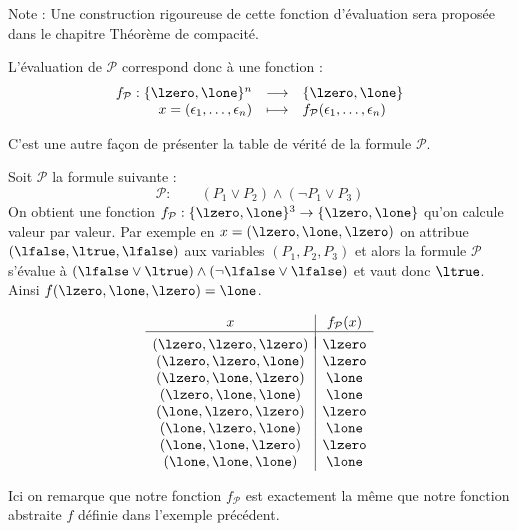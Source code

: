 \documentclass[11pt,class=report,crop=false]{standalone}
\begin{document}
Note : Une construction rigoureuse de cette fonction d'évaluation sera proposée dans le chapitre \og{}Théorème de compacité\fg{}.

L'évaluation de $\mathcal{P}$ correspond donc à une fonction :
\[
\begin{array}{rcl}
	f_{\mathcal{P}} : \{\lzero,\lone\}^n & \longrightarrow & \{\lzero,\lone\} \\
	x= (\epsilon_1,\ldots,\epsilon_n) & \longmapsto & f_{\mathcal{P}}(\epsilon_1,\ldots,\epsilon_n) 
\end{array}
\]

C'est une autre façon de présenter la table de vérité de la formule $\mathcal{P}$.


\begin{exemple}
	Soit $\mathcal{P}$ la formule suivante :
	\[
	\mathcal{P} : \qquad (P_1 \lor P_2) \land (\lnot P_1 \lor P_3)
	\]
	On obtient une fonction $f_{\mathcal{P}} : \{\lzero,\lone\}^3 \to \{\lzero,\lone\}$ qu'on calcule valeur par valeur.
	Par exemple en $x=(\lzero,\lone,\lzero)$ on attribue $(\lfalse,\ltrue,\lfalse)$ aux variables $(P_1,P_2,P_3)$ et alors la formule $\mathcal{P}$ s’évalue à $(\lfalse \lor \ltrue) \land (\lnot \lfalse \lor \lfalse)$ et vaut donc $\ltrue$. Ainsi $f(\lzero,\lone,\lzero) = \lone$.

	\[
	\begin{array}{c|c}
		x & f_{\mathcal{P}}(x) \\
		\hline
		& \\[-2ex]
		(\lzero,\lzero,\lzero) & \lzero \\
		(\lzero,\lzero,\lone)  & \lzero \\
		(\lzero,\lone,\lzero)  & \lone \\
		(\lzero,\lone,\lone)   & \lone \\
		(\lone,\lzero,\lzero)  & \lzero \\
		(\lone,\lzero,\lone)   & \lone \\
		(\lone,\lone,\lzero)   & \lzero \\
		(\lone,\lone,\lone)    & \lone \\
	\end{array}
	\]
	
	Ici on remarque que notre fonction $f_\mathcal{P}$ est exactement la même que notre fonction abstraite $f$ définie dans l'exemple précédent.
		
\end{exemple}



\end{document}
